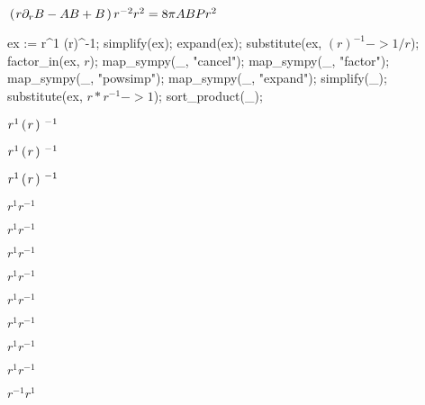 \documentclass[10pt]{article}
\newcommand\brwrap[3]{%
  \setbox0=\hbox{$#2$}
  \left#1\vbox to \the\ht0{\hbox to 0pt{}}\right.\kern-.2em
  \begingroup #2\endgroup\kern-.15em
  \left.\vbox to \the\ht0{\hbox to 0pt{}}\right#3
}
\begin{document}
\begin{adjustwidth}{1em}{0cm}${}\brwrap{(}{r \partial_{r}{B}-A B+B}{)} {r}^{-2} r^{2} = 8\pi A B P r^{2}$\end{adjustwidth}
\begin{python}
ex := r^1 (r)^{-1};
simplify(ex);
expand(ex);
substitute(ex, $(r)^{-1} -> 1/r$);
factor_in(ex, $r$);
map_sympy(_, "cancel"); 
map_sympy(_, "factor"); 
map_sympy(_, "powsimp");
map_sympy(_, "expand");
simplify(_);
substitute(ex,  $r*r ^{-1} -> 1$);
sort_product(_);
\end{python}
\begin{adjustwidth}{1em}{0cm}${}r^{1} \brwrap{(}{r}{)}\,^{-1}$\end{adjustwidth}
\begin{adjustwidth}{1em}{0cm}${}r^{1} \brwrap{(}{r}{)}\,^{-1}$\end{adjustwidth}
\begin{adjustwidth}{1em}{0cm}${}r^{1} \brwrap{(}{r}{)}\,^{-1}$\end{adjustwidth}
\begin{adjustwidth}{1em}{0cm}${}r^{1} {r}^{-1}$\end{adjustwidth}
\begin{adjustwidth}{1em}{0cm}${}r^{1} {r}^{-1}$\end{adjustwidth}
\begin{adjustwidth}{1em}{0cm}${}r^{1} {r}^{-1}$\end{adjustwidth}
\begin{adjustwidth}{1em}{0cm}${}r^{1} {r}^{-1}$\end{adjustwidth}
\begin{adjustwidth}{1em}{0cm}${}r^{1} {r}^{-1}$\end{adjustwidth}
\begin{adjustwidth}{1em}{0cm}${}r^{1} {r}^{-1}$\end{adjustwidth}
\begin{adjustwidth}{1em}{0cm}${}r^{1} {r}^{-1}$\end{adjustwidth}
\begin{adjustwidth}{1em}{0cm}${}r^{1} {r}^{-1}$\end{adjustwidth}
\begin{adjustwidth}{1em}{0cm}${}{r}^{-1} r^{1}$\end{adjustwidth}
\begin{python}
\end{python}
\begin{python}
\end{python}
\begin{python}
\end{python}
\end{document}
